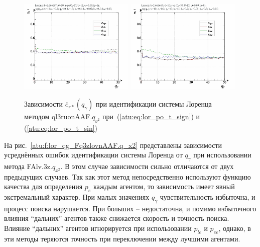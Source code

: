 \begin{figure}[ht!]
  \centerline{
    \includegraphics[width=0.49\textwidth]{p/cha/lor/ql3ruonAAF/lor_ql3ruonAAF_qy2-p_qgamma_e_sign.png}
    \hfill
    \includegraphics[width=0.49\textwidth]{p/cha/lor/ql3ruonAAF/lor_ql3ruonAAF_qy2-p_qgamma_e_sin.png}
  }
  \caption{Зависимости $\overline{e}_{r*}(q_\gamma)$ при идентификации системы Лоренца методом ql3ruonAAF.$q_{y^2}$
   при~(\ref{atu:eq:lor_po_t_sign}) и (\ref{atu:eq:lor_po_t_sin})}
  \label{atu:f:lor_qg_ql3ruonAAF.q_y2}
\end{figure}


На рис.~\ref{atu:f:lor_qg_Fq3zlovnAAF.q_x2} представлены зависимости
усреднённых ошибок идентификации системы Лоренца от $q_\gamma$ при использовании метода FAlv.3z.$q_{x^2}$.
В этом случае зависимости сильно отличаются от двух предыдущих случаев.
Так как этот метод непосредственно используют функцию
качества для определения $p_e$ каждым агентом, то зависимость
имеет явный экстремальный характер.
При малых значениях $q_\gamma$ чувствительность избыточна,
и процесс поиска нарушается.
При больших -- недостаточна, и помимо избыточного влияния ``дальних'' агентов также снижается скорость и точность поиска.
Влияние  ``дальних'' агентов игнорируется при использовании
$p_{le}$ и $p_{ee}$, однако,
в эти методы теряются точность при переключении
между лучшими агентами.


